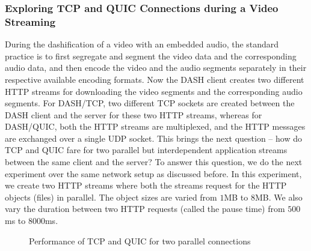\subsubsection{Exploring TCP and QUIC Connections during a Video Streaming}
During the dashification of a video with an embedded audio, the standard practice is to first segregate and segment the video data and the corresponding audio data, and then encode the video and the audio segments separately in their respective available encoding formats.
Now the DASH client creates two different HTTP streams for downloading the video segments and the corresponding audio segments. For DASH/TCP, two different TCP sockets are created between the DASH client and the server for these two HTTP streams, whereas for DASH/QUIC, both the HTTP streams are multiplexed, and the HTTP messages are exchanged over a single UDP socket.
This brings the next question -- how do TCP and QUIC fare for two parallel but interdependent application streams between the same client and the server?  To answer this question, we do the next experiment over the same network setup as discussed before. In this experiment, we create two HTTP streams where both the streams request for the HTTP objects (files) in parallel. The object sizes are varied from $1$MB to $8$MB.
We also vary the duration between two HTTP requests (called the pause time) from $500$ms to $8000$ms. 

\begin{figure}[!ht]
	\captionsetup[subfigure]{}
	\begin{center}
	\end{center}
	\caption{\label{fig:chap03s2:proofUhoodM}Performance of TCP and QUIC for two parallel connections}
\end{figure}


